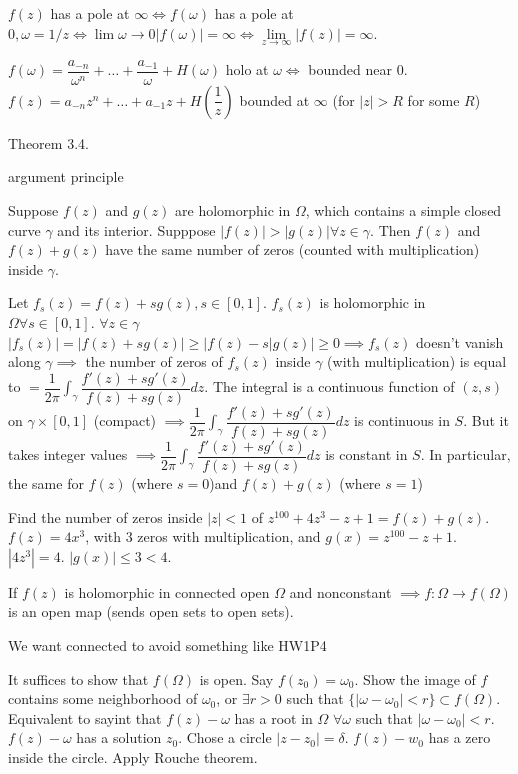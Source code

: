 \documentclass[10pt]{article}
\begin{document}
$f(z)$ has a pole at $\infty \iff f(\omega)$ has a pole at $0, \omega = 1/z \iff \lim\limits{\omega\to0}|f(\omega)| = \infty \iff\lim\limits_{z\to\infty}|f(z)| = \infty$.

$f(\omega) = \dfrac{a_{-n}}{\omega^n} + \ldots + \dfrac{a_{-1}}{\omega} + H(\omega)$ holo at $\omega \iff$ bounded near 0. $f(z) = a_{-n}z^n + \ldots + a_{-1}z + H(\dfrac{1}{z})$ bounded at $\infty$ (for $|z| > R$ for some $R$)

Theorem 3.4.

argument principle

\begin{thm}
   Suppose $f(z)$ and $g(z)$ are holomorphic in $\Omega$, which contains a simple closed curve $\gamma$ and its interior. Supppose $|f(z)| > |g(z)| \forall z \in \gamma$. Then $f(z)$ and $f(z) + g(z)$ have the same number of zeros (counted with multiplication) inside $\gamma$.
\end{thm}
Let $f_s(z) = f(z) + sg(z), s\in [0, 1]$. $f_s(z)$ is holomorphic in $\Omega \forall s \in [0, 1]$. $\forall z\in \gamma$ $|f_s(z)| = |f(z) + sg(z)| \geq |f(z) - s|g(z)| \geq 0 \implies f_s(z)$ doesn't vanish along $\gamma \implies $ the number of zeros of $f_s(z)$ inside $\gamma$ (with multiplication) is equal to $= \dfrac{1}{2\pi}\int_\gamma \dfrac{f'(z) + sg'(z)}{f(z) + sg(z)}dz$.
 The integral is a continuous function of $(z, s)$ on $\gamma \times [0, 1]$ (compact) %
$\implies \dfrac{1}{2\pi}\int_\gamma \dfrac{f'(z) + sg'(z)}{f(z) + sg(z)}dz$ is continuous in $S$. But it takes integer values $\implies \dfrac{1}{2\pi}\int_\gamma \dfrac{f'(z) + sg'(z)}{f(z) + sg(z)}dz$ is constant in $S$. In particular, the same for $f(z)$ (where $s = 0$)and $f(z) + g(z)$ (where $s = 1$)

\begin{exm}
   Find the number of zeros inside $|z| < 1$ of $z^{100} + 4z^3 -z + 1 = f(z) + g(z)$. $f(z) = 4x^3$, with 3 zeros with multiplication, and $g(x) = z^{100} - z + 1$. $|4z^3| = 4$. $|g(x)| \leq 3 < 4$.
\end{exm}

\begin{thm}
   If $f(z)$ is holomorphic in connected open $\Omega$ and nonconstant $\implies f: \Omega \to f(\Omega)$ is an open map (sends open sets to open sets).
\end{thm}
\begin{rmk}
   We want connected to avoid something like HW1P4
\end{rmk}
It suffices to show that $f(\Omega)$ is open. Say $f(z_0) = \omega_0$. Show the image of $f$ contains some neighborhood of $\omega_0$, or $\exists r > 0$ such that $\{|\omega-\omega_0| < r\} \subset f(\Omega)$. Equivalent to sayint that $f(z) - \omega$ has a root in $\Omega$ $\forall \omega$ such that $|\omega - \omega_0| < r$. $f(z) - \omega$ has a solution $z_0$. Chose a circle $|z - z_0| = \delta$. $f(z) - w_0$ has a zero inside the circle.
Apply Rouche theorem. 
\end{document}
